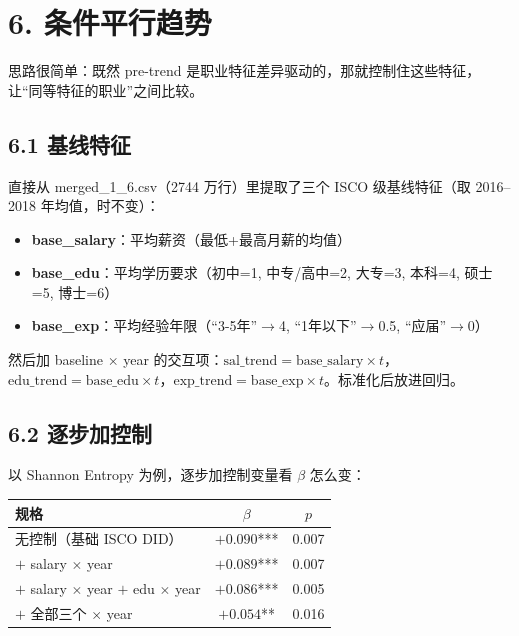 \documentclass[12pt,a4paper]{article}
\begin{document}
\section*{6. 条件平行趋势}

思路很简单：既然 pre-trend 是职业特征差异驱动的，那就控制住这些特征，让“同等特征的职业”之间比较。

\subsection*{6.1 基线特征}

直接从 merged\_1\_6.csv（2744 万行）里提取了三个 ISCO 级基线特征（取 2016--2018 年均值，时不变）：

\begin{itemize}
  \item \textbf{base\_salary}：平均薪资（最低+最高月薪的均值）
  \item \textbf{base\_edu}：平均学历要求（初中=1, 中专/高中=2, 大专=3, 本科=4, 硕士=5, 博士=6）
  \item \textbf{base\_exp}：平均经验年限（“3-5年”$\rightarrow$4, “1年以下”$\rightarrow$0.5, “应届”$\rightarrow$0）
\end{itemize}

然后加 baseline $\times$ year 的交互项：$\text{sal\_trend} = \text{base\_salary} \times t$，$\text{edu\_trend} = \text{base\_edu} \times t$，$\text{exp\_trend} = \text{base\_exp} \times t$。标准化后放进回归。

\subsection*{6.2 逐步加控制}

以 Shannon Entropy 为例，逐步加控制变量看 $\beta$ 怎么变：

\begin{center}
\small
\begin{tabular}{lcc}
\toprule
规格 & $\beta$ & $p$ \\
\midrule
无控制（基础 ISCO DID） & $+0.090$*** & 0.007 \\
$+$ salary $\times$ year & $+0.089$*** & 0.007 \\
$+$ salary $\times$ year $+$ edu $\times$ year & $+0.086$*** & 0.005 \\
$+$ 全部三个 $\times$ year & $+0.054$** & 0.016 \\
\bottomrule
\end{tabular}
\end{center}
\end{document}
